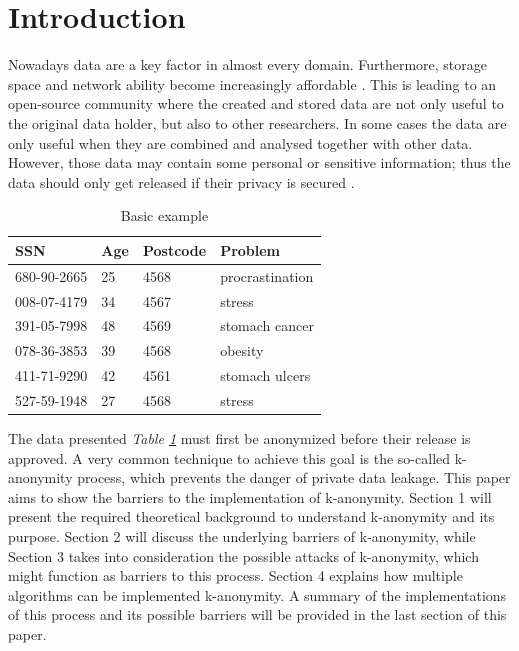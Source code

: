 \documentclass{llncs}
\begin{document}
\section{Introduction}
Nowadays data are a key factor in almost every domain. Furthermore, storage space and network ability become increasingly affordable \cite{sweeney2002k}. 
This is leading to an open-source community where the created and stored data are not only useful to the original data holder, but also to other researchers. In some cases the data are only useful when they are combined and analysed together with other data. However, those data may contain some personal or sensitive information; thus the data should only get released if their privacy is secured  \cite{li2006achieving}.\\
\begin{table}[]
	\centering
	\caption{Basic example}
	\label{intro_example}
	\begin{tabular}{@{}llll@{}}
		\toprule
		SSN         & Age & Postcode & Problem         \\ \midrule
		680-90-2665 & 25  & 4568     & procrastination \\
		008-07-4179 & 34  & 4567     & stress          \\
		391-05-7998 & 48  & 4569     & stomach cancer  \\
		078-36-3853 & 39  & 4568     & obesity         \\
		411-71-9290 & 42  & 4561     & stomach ulcers  \\
		527-59-1948 & 27  & 4568     & stress          \\ \bottomrule
	\end{tabular}
\end{table}

The data presented \textit{Table \ref{intro_example}} must first be anonymized before their release is approved. A very common technique to achieve this goal is the so-called k-anonymity process, which prevents the danger of private data leakage. This paper aims to show the barriers to the implementation of k-anonymity. Section 1 will present the required theoretical background to understand k-anonymity and its purpose. Section 2 will discuss the underlying barriers of k-anonymity, while Section 3 takes into consideration the possible attacks of k-anonymity, which might function as barriers to this process. Section 4 explains how multiple algorithms can be implemented k-anonymity. A summary of the implementations of this process and its possible barriers  will be provided in the last section of this paper.
\newpage
\end{document}
